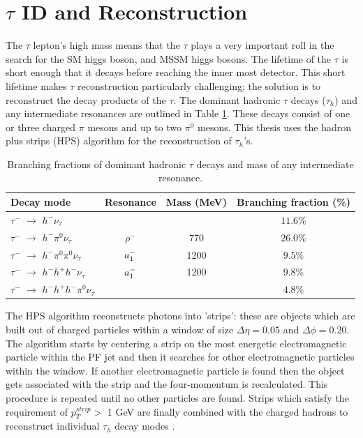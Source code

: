 \section{$\tau$ ID and Reconstruction}
The $\tau$ lepton's high mass means that the $\tau$ plays a very important
roll in the search for the SM higgs boson, and MSSM higgs bosons.
The lifetime of the $\tau$ is short enough that it decays before reaching the inner
most detector. This short lifetime makes $\tau$ reconstruction particularly challenging;
the solution is to reconstruct the decay products of the $\tau$. 
The dominant hadronic $\tau$ decays ($\tau_{h}$) 
and any intermediate resonances are 
outlined in Table \ref{tab:decay_modes}. 
These decays consist of one or three charged $\pi$ mesons and up to two $\pi^{0}$ mesons.
This thesis uses the hadron plus strips (HPS) algorithm for the reconstruction of 
$\tau_{h}$'s. %
\begin{table}[b]
\begin{center}
\begin{tabular}{|l|c|c|c|}
\hline
Decay mode & Resonance & Mass (MeV) &  Branching fraction (\%) \\
\hline
$\tau^{-}$  $\rightarrow $  $h^{-} \nu_{\tau}$ &  &  & $11.6\%$ \\
$\tau^{-}$  $\rightarrow $  $h^{-} \pi^{0}  \nu_{\tau}$ & $\rho^{-}$ & 770 & $26.0\%$ \\
$\tau^{-}$  $\rightarrow $  $h^{-} \pi^{0}\pi^{0}  \nu_{\tau}$ & $a_{\rm{1}}^{-}$ & 1200 & $9.5\%$ \\
$\tau^{-}$  $\rightarrow $  $h^{-} h^{+} h^{-} \nu_{\tau}$ & $a_{\rm{1}}^{-}$  & 1200 & $9.8\%$ \\
$\tau^{-}$  $\rightarrow $  $h^{-} h^{+} h^{-}\pi^{0}  \nu_{\tau}$ & & & $4.8\%$ \\
      \hline
\end{tabular}
\caption{
   Branching fractions of dominant hadronic $\tau$ decays and mass of any intermediate resonance. 
   }
\label{tab:decay_modes}
\end{center}
\end{table}

The HPS algorithm 
reconstructs photons into 'strips': these are objects which are built
out of charged particles within a window of size $\Delta\eta=0.05$
and $\Delta\phi=0.20$. The algorithm starts by centering a strip on the
most energetic electromagnetic particle within the PF jet and then it searches
for other electromagnetic particles within the window. If another electromagnetic
particle is found then the object gets associated with the strip and
the four-momentum is recalculated. This procedure is repeated until no other
particles are found. Strips which satisfy the requirement of $p_{T}^{strip}>$ 1 GeV 
are finally combined with the charged hadrons to reconstruct individual
$\tau_{h}$ decay modes \cite{CMS-PAS-TAU-11-001}.

